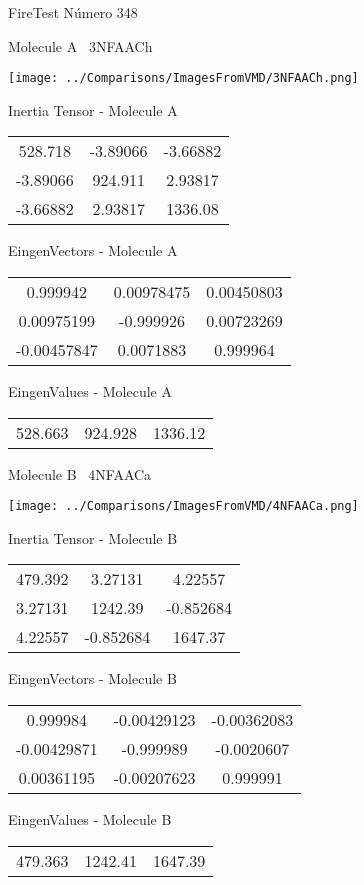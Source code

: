 \vtab[-3cm]
\begin{center}
{\large FireTest \tab Número 348}
\end{center}
\begin{multicols}{2}
\begin{center}

Molecule A \
3NFAACh

\texttt{[image: ../Comparisons/ImagesFromVMD/3NFAACh.png]}

Inertia Tensor - Molecule A \\
\begin{tabular}{|c c c|}
528.718	 & 	-3.89066	 & 	-3.66882	 \\
-3.89066	 & 	924.911	 & 	2.93817	 \\
-3.66882	 & 	2.93817	 & 	1336.08
\end{tabular}

\vtab
 EingenVectors - Molecule A     \\
\begin{tabular}{|c c c|}
0.999942	 & 	0.00978475	 & 	0.00450803	 \\
0.00975199	 & 	-0.999926	 & 	0.00723269	 \\
-0.00457847	 & 	0.0071883	 & 	0.999964
\end{tabular}

\vtab
 EingenValues - Molecule A     \\
\begin{tabular}{|c c c|}
528.663	 & 	924.928	 & 	1336.12	 \\
\end{tabular}
\columnbreak

Molecule B \
4NFAACa

\texttt{[image: ../Comparisons/ImagesFromVMD/4NFAACa.png]}

Inertia Tensor - Molecule B \\
\begin{tabular}{|c c c|}
479.392	 & 	3.27131	 & 	4.22557	 \\
3.27131	 & 	1242.39	 & 	-0.852684	 \\
4.22557	 & 	-0.852684	 & 	1647.37
\end{tabular}

\vtab
 EingenVectors - Molecule B     \\
\begin{tabular}{|c c c|}
0.999984	 & 	-0.00429123	 & 	-0.00362083	 \\
-0.00429871	 & 	-0.999989	 & 	-0.0020607	 \\
0.00361195	 & 	-0.00207623	 & 	0.999991
\end{tabular}

\vtab
 EingenValues - Molecule B     \\
\begin{tabular}{|c c c|}
479.363	 & 	1242.41	 & 	1647.39	 \\
\end{tabular}

\end{center}
\end{multicols}

